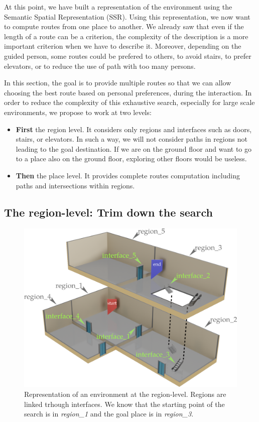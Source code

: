 At this point, we have built a representation of the environment using the Semantic Spatial Representation (SSR). Using this representation, we now want to compute routes from one place to another. We already saw that even if the length of a route can be a criterion, the complexity of the description is a more important criterion when we have to describe it. Moreover, depending on the guided person, some routes could be prefered to others, to avoid stairs, to prefer elevators, or to reduce the use of path with too many persons.

In this section, the goal is to provide multiple routes so that we can allow choosing the best route based on personal preferences, during the interaction. In order to reduce the complexity of this exhaustive search, especially for large scale environments, we propose to work at two levels:
\begin{itemize}
\item \textbf{First} the region level. It considers only regions and interfaces such as doors, stairs, or elevators. In such a way, we will not consider paths in regions not leading to the goal destination. If we are on the ground floor and want to go to a place also on the ground floor, exploring other floors would be useless.
\item \textbf{Then} the place level. It provides complete routes computation including paths and intersections within regions.
\end{itemize}

\subsection{The region-level: Trim down the search}

\begin{figure}[ht!]
\centering
\includegraphics[scale=0.22]{figures/chapter3/building_regions.png}
\caption{\label{fig:chap3_regions} Representation of an environment at the region-level. Regions are linked trhough interfaces. We know that the starting point of the search is in \textit{region\_1} and the goal place is in \textit{region\_3}. }
\end{figure}


